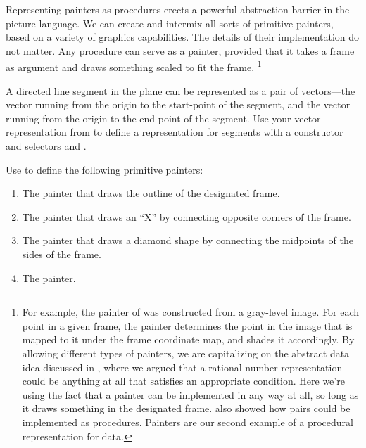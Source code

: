 Representing painters as procedures erects a powerful abstraction barrier in the picture language.
We can create and intermix all sorts of primitive painters, based on a variety of graphics capabilities.
The details of their implementation do not matter.
Any procedure can serve as a painter, provided that it takes a frame as argument and draws something scaled to fit the frame.%
\footnote{
	For example, the  painter of  was constructed from a gray-level image.
	For each point in a given frame, the  painter determines the point in the image that is mapped to it under the frame coordinate map, and shades it accordingly.
	By allowing different types of painters, we are capitalizing on the abstract data idea discussed in , where we argued that a rational-number representation could be anything at all that satisfies an appropriate condition.
	Here we’re using the fact that a painter can be implemented in any way at all, so long as it draws something in the designated frame.
	 also showed how pairs could be implemented as procedures.
	Painters are our second example of a procedural representation for data.
}



\begin{exercise}
	\label{Exercise 2.48}
	A directed line segment in the plane can be represented as a pair of vectors---the vector running from the origin to the start-point of the segment, and the vector running from the origin to the end-point of the segment.
	Use your vector representation from  to define a representation for segments with a constructor  and selectors  and .
\end{exercise}



\begin{exercise}
	\label{Exercise 2.49}
	Use  to define the following primitive painters:
	\begin{enumerate}[label = \alph*., leftmargin = *]

		\item
			The painter that draws the outline of the designated frame.

		\item
			The painter that draws an “X” by connecting opposite corners of the frame.

		\item
			The painter that draws a diamond shape by connecting the midpoints of the sides of the frame.

		\item
			The  painter.

	\end{enumerate}
\end{exercise}




